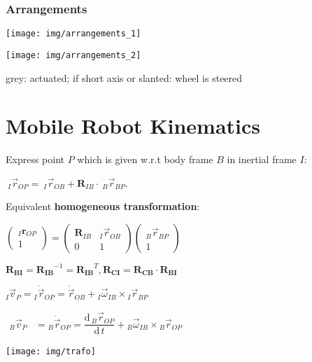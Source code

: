 \documentclass[fontsize=6pt]{scrartcl}
\newcommand{\mat}[1]{\mathbf{#1}}
\begin{document}
\begin{multicols*}{4}
\subsubsection*{Arrangements}
{\centering
\texttt{[image: img/arrangements\_1]}

\texttt{[image: img/arrangements\_2]}
\par}

grey: actuated; if short axis or slanted: wheel is steered



\section*{Mobile Robot Kinematics}


\begin{minipage}{0.65\linewidth}
Express point $P$ which is given w.r.t body frame $B$ in inertial frame $I$:

$~_I \vec{r}_{OP} = ~_I\vec{r}_{OB} + \mat{R}_{IB}\cdot ~_B\vec{r}_{BP}$.


Equivalent \textbf{homogeneous transformation}:

$
\begin{pmatrix}
{}_I\mathbf{r}_{OP} \\
1
\end{pmatrix}
=
\begin{pmatrix}
\mat{R}_{IB} & {}_I\vec{r}_{OB} \\
0 & 1
\end{pmatrix}
\begin{pmatrix}
{}_B\vec{r}_{BP} \\
1
\end{pmatrix}
$

$\mat{R_{BI}} = \mat{R_{IB}}^{-1} = \mat{R_{IB}}^{T}, \mat{R_{CI}} = \mat{R_{CB}} \cdot  \mat{R_{BI}}$

${}_I \vec v_P = {}_I \dot{\vec r}_{OP} = \dot{\vec r}_{OB} +
{}_I\vec{\omega}_{IB} \times {}_I\vec r_{BP}$

$
\begin{aligned}
{}_B\vec v_P &= {}_B\dot{\vec r}_{OP} = \dfrac{\mathrm	d\, {}_B\vec r_{OP}}{\mathrm d \,t} + {}_B\vec\omega_{IB} \times {}_B\vec r_{OP}
\end{aligned}
$
\end{minipage}
\begin{minipage}{0.35\linewidth}
\texttt{[image: img/trafo]}
\end{minipage}


\end{multicols*}
\end{document}

